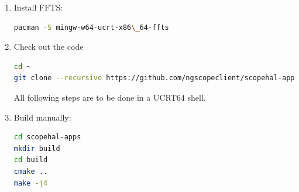 \begin{enumerate}
\item Install FFTS:
\begin{lstlisting}[language=sh, numbers=none]
pacman -S mingw-w64-ucrt-x86\_64-ffts
\end{lstlisting}


\item Check out the code

\begin{lstlisting}[language=sh, numbers=none]
cd ~
git clone --recursive https://github.com/ngscopeclient/scopehal-apps
\end{lstlisting}

All following steps are to be done in a UCRT64 shell.

\item Build manually:
\begin{lstlisting}[language=sh, numbers=none]
cd scopehal-apps
mkdir build
cd build
cmake ..
make -j4
\end{lstlisting}













\end{enumerate}
